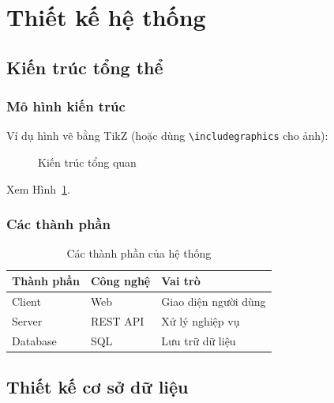 \section{Thiết kế hệ thống}
\subsection{Kiến trúc tổng thể}
\subsubsection{Mô hình kiến trúc}
Ví dụ hình vẽ bằng TikZ (hoặc dùng \verb|\includegraphics| cho ảnh):
\begin{figure}[H]
  \centering
  \caption{Kiến trúc tổng quan}
  \label{fig:architecture}
\end{figure}
Xem Hình~\ref{fig:architecture}.

\subsubsection{Các thành phần}
\begin{table}[H]
  \centering
  \caption{Các thành phần của hệ thống}
  \label{tab:components}
  \begin{tabular}{lll}
    \toprule
    \textbf{Thành phần} & \textbf{Công nghệ} & \textbf{Vai trò} \\
    \midrule
    Client & Web & Giao diện người dùng \\
    Server & REST API & Xử lý nghiệp vụ \\
    Database & SQL & Lưu trữ dữ liệu \\
    \bottomrule
  \end{tabular}
\end{table}

\subsection{Thiết kế cơ sở dữ liệu}
